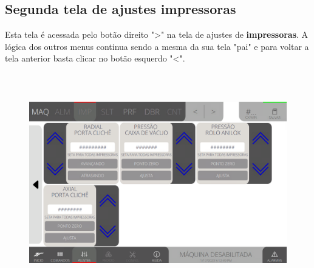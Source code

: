 \subsection{Segunda tela de ajustes impressoras}\label{telaAjustesImpressorasSegundaTelaDeAjustesImpressoras}
Esta tela é acessada pelo botão direito "\textgreater" na tela de ajustes de \textbf{impressoras}. A lógica dos outros menus continua sendo a mesma da sua tela "pai" e para voltar a tela anterior basta clicar no botão esquerdo "\textless{}".
\vspace*{\fill}
\begin{figure}[h]
  \centering
  \includegraphics[width=576px,height=360px]{src/imagesFlexo/04-printter/01-printters/settings/e-Tela-Principal-2.png}
\end{figure}
\vspace*{\fill}

\newpage
\thispagestyle{fancy}
\vspace*{40 pt}
